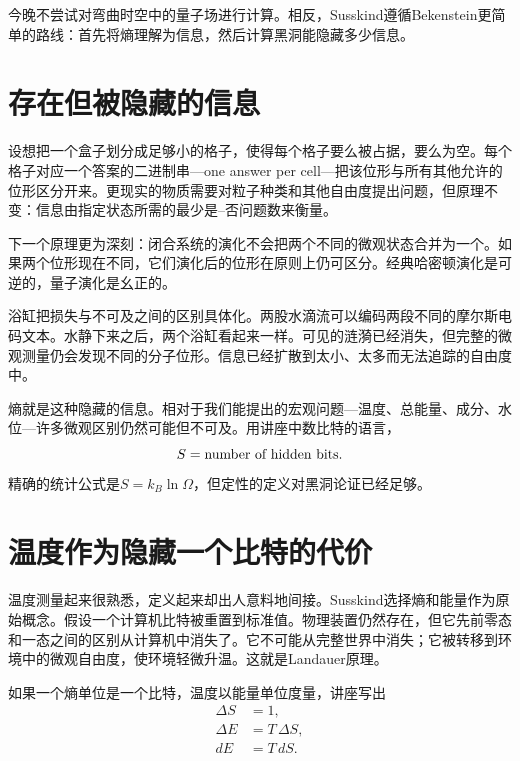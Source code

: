 今晚不尝试对弯曲时空中的量子场进行计算。相反，Susskind遵循Bekenstein更简单的路线：首先将熵理解为信息，然后计算黑洞能隐藏多少信息。

\section{存在但被隐藏的信息}

设想把一个盒子划分成足够小的格子，使得每个格子要么被占据，要么为空。每个格子对应一个答案的二进制串---one answer per cell---把该位形与所有其他允许的位形区分开来。更现实的物质需要对粒子种类和其他自由度提出问题，但原理不变：信息由指定状态所需的最少是--否问题数来衡量。

\begin{classroomqa}
\end{classroomqa}

下一个原理更为深刻：闭合系统的演化不会把两个不同的微观状态合并为一个。如果两个位形现在不同，它们演化后的位形在原则上仍可区分。经典哈密顿演化是可逆的，量子演化是幺正的。

浴缸把损失与不可及之间的区别具体化。两股水滴流可以编码两段不同的摩尔斯电码文本。水静下来之后，两个浴缸看起来一样。可见的涟漪已经消失，但完整的微观测量仍会发现不同的分子位形。信息已经扩散到太小、太多而无法追踪的自由度中。

熵就是这种隐藏的信息。相对于我们能提出的宏观问题---温度、总能量、成分、水位---许多微观区别仍然可能但不可及。用讲座中数比特的语言，
\begin{equation}
S=\hbox{number of hidden bits}.
\end{equation}
精确的统计公式是\(S=k_B\ln\Omega\)，但定性的定义对黑洞论证已经足够。

\section{温度作为隐藏一个比特的代价}

温度测量起来很熟悉，定义起来却出人意料地间接。Susskind选择熵和能量作为原始概念。假设一个计算机比特被重置到标准值。物理装置仍然存在，但它先前零态和一态之间的区别从计算机中消失了。它不可能从完整世界中消失；它被转移到环境中的微观自由度，使环境轻微升温。这就是Landauer原理。

如果一个熵单位是一个比特，温度以能量单位度量，讲座写出
\begin{align}
\Delta S&=1,\\
\Delta E&=T\,\Delta S,\\
dE&=T\,dS.
\label{eq:first-law}
\end{align}

